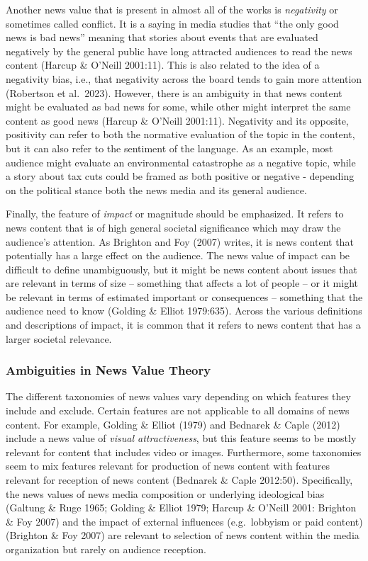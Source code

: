 \documentclass[
]{article}
\begin{document}
Another news value that is present in almost all of the works is
\emph{negativity} or sometimes called conflict. It is a saying in media
studies that ``the only good news is bad news'' meaning that stories
about events that are evaluated negatively by the general public have
long attracted audiences to read the news content (Harcup \& O'Neill
2001:11). This is also related to the idea of a negativity bias, i.e.,
that negativity across the board tends to gain more attention (Robertson
et al.~2023). However, there is an ambiguity in that news content might
be evaluated as bad news for some, while other might interpret the same
content as good news (Harcup \& O'Neill 2001:11). Negativity and its
opposite, positivity can refer to both the normative evaluation of the
topic in the content, but it can also refer to the sentiment of the
language. As an example, most audience might evaluate an environmental
catastrophe as a negative topic, while a story about tax cuts could be
framed as both positive or negative - depending on the political stance
both the news media and its general audience.

Finally, the feature of \emph{impact} or magnitude should be emphasized.
It refers to news content that is of high general societal significance
which may draw the audience's attention. As Brighton and Foy (2007)
writes, it is news content that potentially has a large effect on the
audience. The news value of impact can be difficult to define
unambiguously, but it might be news content about issues that are
relevant in terms of size -- something that affects a lot of people --
or it might be relevant in terms of estimated important or consequences
-- something that the audience need to know (Golding \& Elliot
1979:635). Across the various definitions and descriptions of impact, it
is common that it refers to news content that has a larger societal
relevance.

\hypertarget{ambiguities-in-news-value-theory}{%
\subsubsection{Ambiguities in News Value
Theory}\label{ambiguities-in-news-value-theory}}

\noindent The different taxonomies of news values vary depending on
which features they include and exclude. Certain features are not
applicable to all domains of news content. For example, Golding \&
Elliot (1979) and Bednarek \& Caple (2012) include a news value of
\emph{visual attractiveness}, but this feature seems to be mostly
relevant for content that includes video or images. Furthermore, some
taxonomies seem to mix features relevant for production of news content
with features relevant for reception of news content (Bednarek \& Caple
2012:50). Specifically, the news values of news media composition or
underlying ideological bias (Galtung \& Ruge 1965; Golding \& Elliot
1979; Harcup \& O'Neill 2001: Brighton \& Foy 2007) and the impact of
external influences (e.g.~lobbyism or paid content) (Brighton \& Foy
2007) are relevant to selection of news content within the media
organization but rarely on audience reception.
\end{document}
